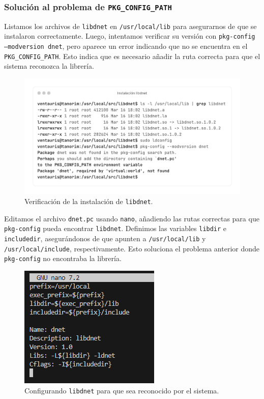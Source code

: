 \documentclass[11pt,a4paper,twoside]{report}
\begin{document}
\subsubsection*{Solución al problema de \texttt{PKG\_CONFIG\_PATH}}

Listamos los archivos de \texttt{libdnet} en \texttt{/usr/local/lib} para asegurarnos de que se instalaron correctamente. Luego, intentamos verificar su versión con \texttt{pkg-config --modversion dnet}, pero aparece un error indicando que no se encuentra en el \texttt{PKG\_CONFIG\_PATH}. Esto indica que es necesario añadir la ruta correcta para que el sistema reconozca la librería.

\begin{figure}[H]
	\centering
	\includegraphics[scale=0.12]{instalacion_snort/6-6.png}
	\caption{Verificación de la instalación de \texttt{libdnet}.}
\end{figure}

\newpage

Editamos el archivo \texttt{dnet.pc} usando \texttt{nano}, añadiendo las rutas correctas para que \texttt{pkg-config} pueda encontrar \texttt{libdnet}. Definimos las variables \texttt{libdir} e \texttt{includedir}, asegurándonos de que apunten a \texttt{/usr/local/lib} y \texttt{/usr/local/include}, respectivamente. Esto soluciona el problema anterior donde \texttt{pkg-config} no encontraba la librería.

\begin{figure}[H]
	\centering
	\includegraphics[scale=1]{instalacion_snort/7.png}
	\caption{Configurando \texttt{libdnet} para que sea reconocido por el sistema.}
\end{figure}
\end{document}
